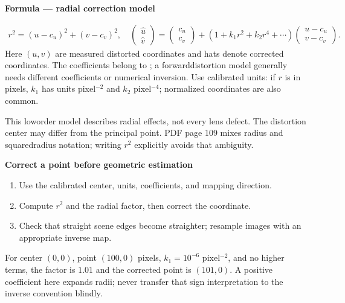 \documentclass[letterpaper,11pt,english,openany,oneside]{jupyterBook}
\begin{document}
\begin{TextbookBox}
\textbf{Formula — radial correction model}\par\smallskip
\begin{equation}\label{equation:lectures/lecture02/two-view:eq-lec02-radial}
\begin{split}r^2=(u-c_u)^2+(v-c_v)^2,\quad
\begin{pmatrix}\widehat u\\\widehat v\end{pmatrix}
=\begin{pmatrix}c_u\\c_v\end{pmatrix}
+(1+k_1r^2+k_2r^4+\cdots)
\begin{pmatrix}u-c_u\\v-c_v\end{pmatrix}.\end{split}
\end{equation}
\sphinxAtStartPar
Here \((u,v)\) are measured distorted coordinates and hats denote corrected coordinates. The coefficients belong to ; a forward\sphinxhyphen{}distortion model generally needs different coefficients or numerical inversion. Use calibrated units: if \(r\) is in pixels, \(k_1\) has units pixel\(^{-2}\) and \(k_2\) pixel\(^{-4}\); normalized coordinates are also common.

\sphinxAtStartPar
This low\sphinxhyphen{}order model describes radial effects, not every lens defect. The distortion center may differ from the principal point. PDF page 109 mixes radius and squared\sphinxhyphen{}radius notation; writing \(r^2\) explicitly avoids that ambiguity.

\end{TextbookBox}

\begin{TextbookBox}
\textbf{Correct a point before geometric estimation}\par\smallskip
\begin{enumerate}
%
\item {}
\sphinxAtStartPar
Use the calibrated center, units, coefficients, and mapping direction.

\item {}
\sphinxAtStartPar
Compute \(r^2\) and the radial factor, then correct the coordinate.

\item {}
\sphinxAtStartPar
Check that straight scene edges become straighter; resample images with an appropriate inverse map.

\end{enumerate}

\sphinxAtStartPar
For center \((0,0)\), point \((100,0)\) pixels, \(k_1=10^{-6}\) pixel\(^{-2}\), and no higher terms, the factor is \(1.01\) and the corrected point is \((101,0)\). A positive coefficient here expands radii; never transfer that sign interpretation to the inverse convention blindly.

\end{TextbookBox}
\end{document}
